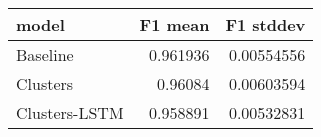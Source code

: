\begin{tabular}{lrr}
\toprule
 model         &   F1 mean &   F1 stddev \\
\midrule
 Baseline      &  0.961936 &  0.00554556 \\
 Clusters      &  0.96084  &  0.00603594 \\
 Clusters-LSTM &  0.958891 &  0.00532831 \\
\bottomrule
\end{tabular}